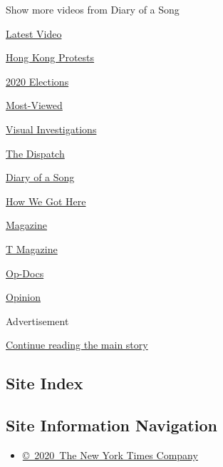 Show more videos from Diary of a Song

\href{/video}{}

\href{/video/latest-video}{Latest Video}

\href{/video/hk-protest}{Hong Kong Protests}

\href{/video/2020-Elections}{2020 Elections}

\href{/video/Most-Viewed}{Most-Viewed}

\href{/video/investigations}{Visual Investigations}

\href{/video/on-the-ground}{The Dispatch}

\href{/video/diaryofasong}{Diary of a Song}

\href{/video/how-we-got-here}{How We Got Here}

\href{/video/magazine}{Magazine}

\href{/video/t-magazine}{T Magazine}

\href{/video/op-docs}{Op-Docs}

\href{/video/opinion}{Opinion}

Advertisement

\protect\hyperlink{after-bottom}{Continue reading the main story}

\hypertarget{site-index}{%
\subsection{Site Index}\label{site-index}}

\hypertarget{site-information-navigation}{%
\subsection{Site Information
Navigation}\label{site-information-navigation}}

\begin{itemize}
\tightlist
\item
  \href{https://help.nytimes.com/hc/en-us/articles/115014792127-Copyright-notice}{©~2020~The
  New York Times Company}
\end{itemize}

